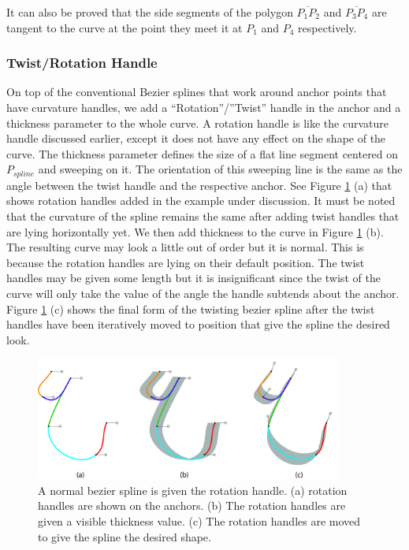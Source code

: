 It can also be proved that the side segments of the polygon $\overline{P_1 P_2}$ and $\overline{P_3 P_4}$ are tangent to the curve at the point they meet it at $P_1$ and $P_4$ respectively.


\subsubsection{Twist/Rotation Handle}
    On top of the conventional Bezier splines that work around anchor points that have curvature handles, we add a “Rotation”/”Twist” handle in the anchor and a thickness parameter to the whole curve. A rotation handle is like the curvature handle discussed earlier, except it does not have any effect on the shape of the curve. The thickness parameter defines the size of a flat line segment  centered on $P_{spline}$ and sweeping on it. The orientation of this sweeping line is the same as the angle between the twist handle and the respective anchor. See Figure \ref{Fig:RotatingBezierSplines} (a) that shows rotation handles added in the example under discussion. It must be noted that the curvature of the spline remains the same after adding twist handles that are lying horizontally yet. We then add thickness to the curve in Figure \ref{Fig:RotatingBezierSplines} (b). The resulting curve may look a little out of order but it is normal. This is because the rotation handles are lying on their default position. The twist handles may be given some length but it is insignificant since the twist of the curve will only take the value of the angle the handle subtends about the anchor. Figure \ref{Fig:RotatingBezierSplines} (c) shows the final form of the twisting bezier spline after the twist handles have been iteratively moved to position that give the spline the desired look.

        \begin{figure}
          \centering
          \includegraphics[width=0.9\textwidth]{AddingTwist_300PPI.jpg}
          \caption{A normal bezier spline is given the rotation handle. (a) rotation handles are shown on the anchors. (b) The rotation handles are given a visible thickness value. (c) The rotation handles are moved to give the spline the desired shape.
          } \label{Fig:RotatingBezierSplines}
        \end{figure}

